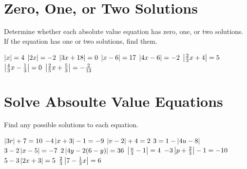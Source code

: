%

\section*{Zero, One, or Two Solutions}
Determine whether each absolute value equation has zero, one, or two solutions.  If the equation has one or two solutions, find them.
\begin{smenum}
\mitemxxxx
{$\left|x\right|=4$}
{$\left|2x\right|=-2$}
{$\left|3x+18\right|=0$}
{$\left|x-6\right|=17$}
\mitemxxxx
{$\left|4x-6\right|=-2$}
{$\left|\frac{2}{3}x+4\right|=5$}
{$\left|\frac{4}{3}x-\frac{1}{3}\right|=0$}
{$\left|\frac{2}{5}x+\frac{5}{3}\right|=-\frac{2}{13}$}
\end{smenum}

\section*{Solve Absoulte Value Equations}
Find any possible solutions to each equation.
\begin{smenum}
\mitemxx
{$\left|3r\right|+7=10$}
{$-4\left|x+3\right|-1=-9$}
\mitemxx
{$\left|v-2\right|+4=2$}
{$3=1-\left|4u-8\right|$}
\mitemxx
{$3-2\left|x-5\right|=-7$}
{$2\left|4y-2(6-y)\right|=36$}
\mitemxx
{$\left|\frac{u}{3}-1\right|=4$}
{$-3\left|p+\frac{2}{3}\right|-1=-10$}
\mitemxx
{$5-3\left|2x+3\right|=5$}
{$\frac{2}{3}\left|7-\frac{1}{3}x\right|=6$}
\end{smenum}

